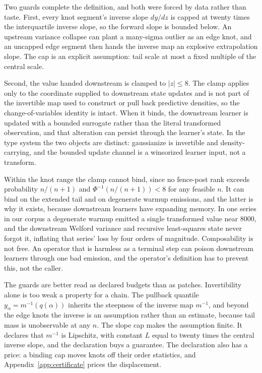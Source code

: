 \documentclass[11pt]{article}
\theoremstyle{remark}
\begin{document}
Two guards complete the definition, and both were forced by data rather than taste. First,
every knot segment's inverse slope $dy/dz$ is capped at twenty times the
interquartile inverse slope, so the forward slope is bounded below. An upstream
variance collapse can plant a many-sigma outlier as an edge knot, and an uncapped edge
segment then hands the inverse map an explosive extrapolation slope. The cap is an explicit
assumption: tail scale at most a fixed multiple of the central scale.

Second, the value handed downstream is clamped to $|z| \le 8$. The clamp applies
only to the coordinate supplied to downstream state updates and is not part of the
invertible map used to construct or pull back predictive densities, so the
change-of-variables identity is intact. When it binds, the downstream learner is updated
with a bounded surrogate rather than the literal transformed observation, and that
alteration can persist through the learner's state. In the type system the two objects
are distinct: gaussianize is invertible and density-carrying, and the bounded update
channel is a winsorized learner input, not a transform.

Within the knot range the clamp cannot bind, since no
fence-post rank exceeds probability $n/(n+1)$ and $\Phi^{-1}(n/(n+1)) < 8$ for any
feasible $n$. It can bind on the extended tail and on degenerate warmup emissions, and
the latter is why it exists, because downstream learners have expanding memory. In one series in our corpus a degenerate warmup emitted a single
transformed value near $8000$, and the downstream Welford variance and recursive
least-squares state never forgot it, inflating that series' loss by four orders of
magnitude. Composability is not free. An operator that is harmless as a terminal step can
poison downstream learners through one bad emission, and the operator's definition has to
prevent this, not the caller.

The guards are better read as declared budgets than as patches. Invertibility alone is
too weak a property for a chain. The pullback quantile $y_\alpha = m^{-1}(q(\alpha))$
inherits the steepness of the inverse map $m^{-1}$, and beyond the edge knots the inverse
is an assumption rather than an estimate, because tail mass is unobservable at any $n$.
The slope cap makes the assumption finite. It declares that $m^{-1}$ is Lipschitz, with
constant $L$ equal to twenty times the central inverse slope, and the declaration buys a
guarantee. The declaration also has a price: a binding cap moves knots off their
order statistics, and Appendix~\ref{app:certificate} prices the displacement.
\end{document}
